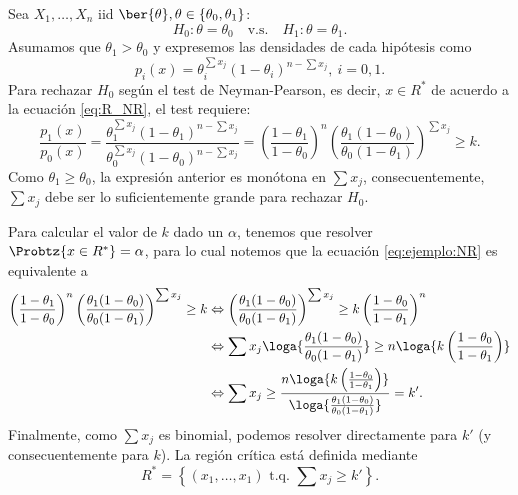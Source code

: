 \begin{example}
	Sea $X_1,\ldots, X_n$ iid $\ber{\theta}, \theta\in\{\theta_0,\theta_1\}$: 
	\begin{equation}
		H_0:\theta =\theta_0\quad \text{v.s.}\quad H_1:\theta = \theta_1.
	\end{equation} 
	Asumamos que $\theta_1>\theta_0$ y expresemos las densidades de cada hipótesis como 
	\begin{equation}
		p_i(x) = \theta_i^{\sum x_j}(1-\theta_i)^{n-\sum x_j},\ i=0,1.
	\end{equation}
	Para rechazar $H_0$ según el test de Neyman-Pearson, es decir, $x\in R^*$ de acuerdo a la ecuación \eqref{eq:R_NR}, el test requiere: 
	\begin{equation}
		\label{eq:ejemplo:NR}
		\frac{p_1(x)}{p_0(x)} = \frac{\theta_1^{\sum x_j}(1-\theta_1)^{n-\sum x_j}}{\theta_0^{\sum x_j}(1-\theta_0)^{n-\sum x_j}} = \left(\frac{1-\theta_1}{1-\theta_0}\right)^n\left(\frac{\theta_1(1-\theta_0)}{\theta_0(1-\theta_1)}\right)^{\sum x_j}\geq k. 
	\end{equation}
	Como $\theta_1\geq\theta_0$, la expresión anterior es monótona en  $\sum x_j$, consecuentemente, $\sum x_j$ debe ser lo suficientemente grande para rechazar $H_0$. 
	
	Para calcular el valor de $k$ dado un $\alpha$, tenemos que resolver $\Probtz{x\in R^*} = \alpha$, para lo cual notemos que la ecuación \eqref{eq:ejemplo:NR} es equivalente a 
	\begin{align}
	 	\left(\frac{1-\theta_1}{1-\theta_0}\right)^n\left(\frac{\theta_1(1-\theta_0)}{\theta_0(1-\theta_1)}\right)^{\sum x_j}\geq k 
	 	& \Leftrightarrow 
	 	\left(\frac{\theta_1(1-\theta_0)}{\theta_0(1-\theta_1)}\right)^{\sum x_j}\geq k \left(\frac{1-\theta_0}{1-\theta_1}\right)^n\\
	 	& \Leftrightarrow 
	 	\sum x_j \loga{\frac{\theta_1(1-\theta_0)}{\theta_0(1-\theta_1)}}\geq n \loga{k \left(\frac{1-\theta_0}{1-\theta_1}\right)} \nonumber\\
	 	& \Leftrightarrow 
	 	\sum x_j \geq \frac{n \loga{k \left(\frac{1-\theta_0}{1-\theta_1}\right)}}{\loga{\frac{\theta_1(1-\theta_0)}{\theta_0(1-\theta_1)}}} = k'. \nonumber
	 \end{align} 
	 Finalmente, como $\sum x_j$ es binomial, podemos resolver directamente para $k'$ (y consecuentemente para $k$). La región crítica  está definida mediante 
	 \begin{equation}
	     R^* = \left\{(x_1,\ldots,x_1) \text{ t.q. } \sum x_j\geq k'\right\}.
	 \end{equation}
\end{example}


